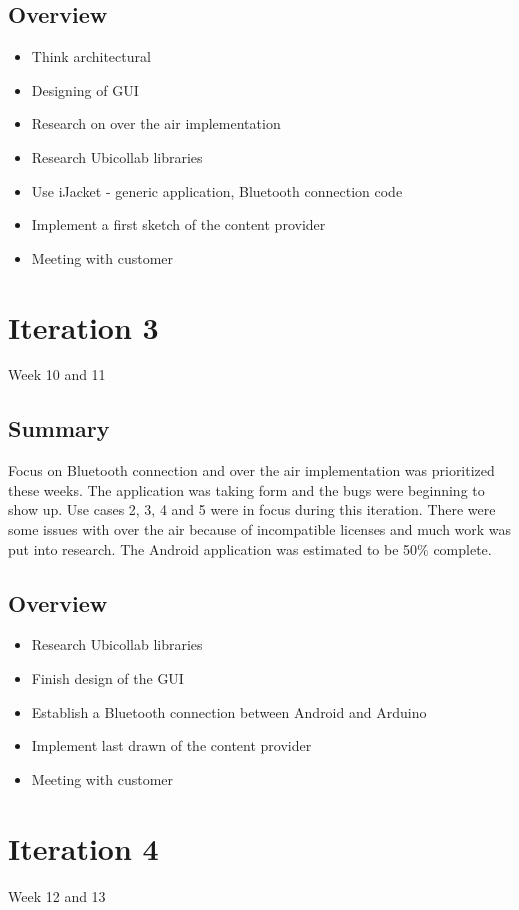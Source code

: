 \subsection{Overview}
\begin{itemize}
	\item{Think architectural}
	\item{Designing of GUI}
	\item{Research on over the air implementation}
	\item{Research Ubicollab libraries}
	\item{Use iJacket - generic application, Bluetooth connection code}
	\item{Implement a first sketch of the content provider}
	\item{Meeting with customer}
\end{itemize}

\section{Iteration 3}
Week 10 and 11
\subsection{Summary}
	Focus on Bluetooth connection and over the air implementation was prioritized these weeks. The application was taking form and the bugs were beginning to show up. Use cases 2, 3, 4 and 5 were in focus during this iteration. There were some issues with over the air because of incompatible licenses and much work was put into research. The Android application was estimated to be 50\% complete.

\subsection{Overview}
\begin{itemize}
	\item{Research Ubicollab libraries}
	\item{Finish design of the GUI}
	\item{Establish a Bluetooth connection between Android and Arduino}
	\item{Implement last drawn of the content provider}%
	\item{Meeting with customer}
\end{itemize}

\section{Iteration 4}\label{Iteration4}
Week 12 and 13
